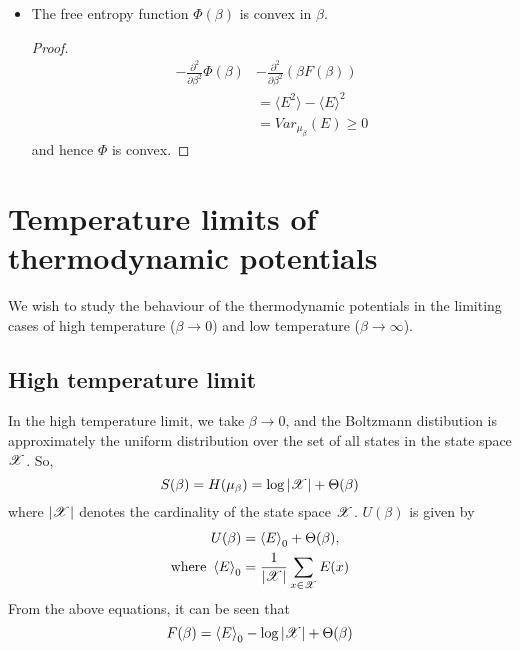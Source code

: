 \documentclass[letterpaper,english,12pt]{article}
\begin{document}
\begin{lem}
\begin{itemize}
\begin{proof}
\begin{align*}
	&= \langle E^2 \rangle - \langle E \rangle^2
\end{align*}
\end{proof}
\item The free entropy function $\Phi(\beta)$ is convex in $\beta$.
\begin{proof}
\begin{align*}
- \frac{\partial^2}{\partial \beta^2} \Phi(\beta) & - \frac{\partial^2}{\partial \beta^2} (\beta F(\beta)) \\
	&= \langle E^2 \rangle - \langle E \rangle^2 \\
	&= Var_{\mu_\beta}(E) \geq 0
\end{align*}
and hence $\Phi$ is convex.
\end{proof}
\end{itemize}
\end{lem}

\section{Temperature limits of thermodynamic potentials}
We wish to study the behaviour of the thermodynamic potentials in the limiting cases of high temperature ($\beta \rightarrow 0$) and low temperature ($\beta \rightarrow \infty$).
\subsection{High temperature limit}
In the high temperature limit, we take $\beta \rightarrow 0$, and the Boltzmann distibution is approximately the uniform distribution over the set of all states in the state space $\mathscr{X}$. So,
\begin{equation}
S(\beta) = H(\mu_\beta) = \log |\mathscr{X}| + \Theta(\beta)\\
\end{equation}
where $|\mathscr{X}|$ denotes the cardinality of the state space $\mathscr{X}$. $U(\beta)$ is given by
\begin{align}
U(\beta) &= \left\langle E \right\rangle_0 + \Theta(\beta),\\
\text{where } \left\langle E \right\rangle_0 &= \frac{1}{|\mathscr{X}|} \sum_{x \in \mathscr{X}} E(x)
\end{align}
From the above equations, it can be seen that
\begin{equation}
F(\beta) = \left\langle E \right\rangle_0 - \log |\mathscr{X}| + \Theta(\beta)
\end{equation}
\end{document}
